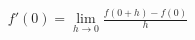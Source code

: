\documentclass[preview]{standalone}
\begin{document}
\begin{align*}
f'(0) = \lim_{h\to 0} \frac{f(0+h)-f(0)}{h}
\end{align*}
\end{document}
